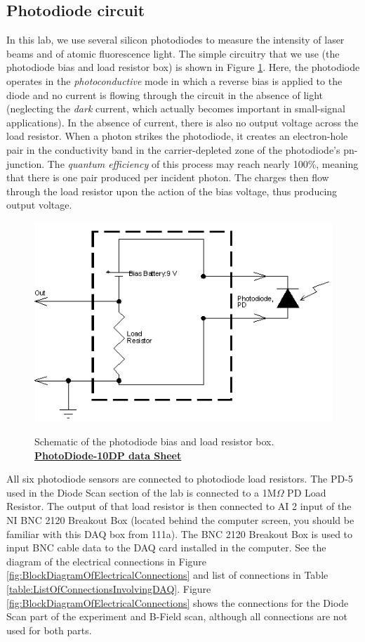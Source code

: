 \documentclass{../lab}
\begin{document}
\newpage

\subsection{Photodiode circuit}

In this lab, we use several silicon photodiodes to measure the intensity of laser beams and of atomic fluorescence light. The simple circuitry that we use (the photodiode bias and load resistor box) is shown in Figure \ref{fig:SchematicOfPhotodiodeBiasAndLoadResistorBox}. Here, the photodiode operates in the \emph{photoconductive} mode in which a reverse bias is applied to the diode and no current is flowing through the circuit in the absence of light (neglecting the \emph{dark} current, which actually becomes important in small-signal applications). In the absence of current, there is also no output voltage across the load resistor. When a photon strikes the photodiode, it creates an electron-hole pair in the conductivity band in the carrier-depleted zone of the photodiode's pn-junction. The \emph{quantum efficiency} of this process may reach nearly 100\%, meaning that there is one pair produced per incident photon. The charges then flow through the load resistor upon the action of the bias voltage, thus producing output voltage.

\begin{figure}[h]
    \centering
    \href{http://experimentationlab.berkeley.edu/sites/default/files/images/MNOimage023.gif}{\includegraphics[width=0.6\linewidth]{images/MNOimage023.png}}
    \caption{Schematic of the photodiode bias and load resistor box. \href{http://experimentationlab.berkeley.edu/sites/default/files/images/PhotoDiode-10DP.pdf}{\textbf{PhotoDiode-10DP data Sheet}}}
    \label{fig:SchematicOfPhotodiodeBiasAndLoadResistorBox}
\end{figure}

All six photodiode sensors are connected to photodiode load resistors. The PD-5 used in the Diode Scan section of the lab is connected to a 1M$\Omega$ PD Load Resistor. The output of that load resistor is then connected to AI 2 input of the NI BNC 2120 Breakout Box (located behind the computer screen, you should be familiar with this DAQ box from 111a). The BNC 2120 Breakout Box is used to input BNC cable data to the DAQ card installed in the computer. See the diagram of the electrical connections in Figure \ref{fig:BlockDiagramOfElectricalConnections} and list of connections in Table \ref{table:ListOfConnectionsInvolvingDAQ}. Figure \ref{fig:BlockDiagramOfElectricalConnections} shows the connections for the Diode Scan part of the experiment and B-Field scan, although all connections are not used for both parts.
\end{document}
